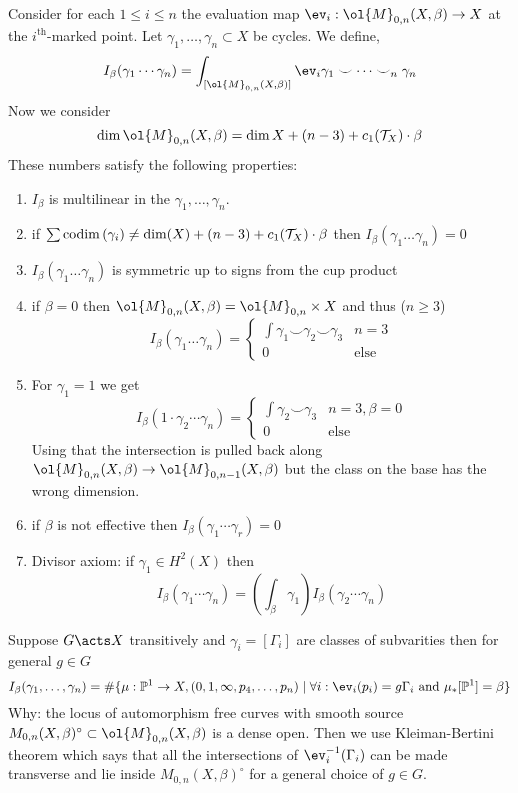 \documentclass[12pt]{article}
\begin{document}
{Consider for each $1 \le i \le n$ the evaluation map $\ev_i : \ol{M}_{0,n}(X, \beta) \to X$ at the $i^{\text{th}}$-marked point. Let $\gamma_1, \dots, \gamma_n \subset X$ be cycles. We define,
\[ I_\beta(\gamma_1 \cdots \gamma_n) = \int_{[ \ol{M}_{0,n}(X, \beta) ]} \ev_i \gamma_1 \smile \cdots \smile_n \gamma_n \]
Now we consider
\[ \dim{\ol{M}_{0,n}(X, \beta)} = \dim{X} + (n-3) + c_1(\T_X) \cdot \beta \]
These numbers satisfy the following properties:
\begin{enumerate}
\item $I_\beta$ is multilinear in the $\gamma_1, \dots, \gamma_n$.
\item if $\sum \mathrm{codim}\left( \gamma_i \right) \neq \dim(X) + (n-3) + c_1(\mathcal{T}_X) \cdot \beta$ then $I_\beta(\gamma_1 \dots \gamma_n) = 0$
\item $I_\beta(\gamma_1 \dots \gamma_n)$ is symmetric up to signs from the cup product
\item if $\beta = 0$ then $\ol{M}_{0,n}(X, \beta) = \ol{M}_{0,n} \times X$ and thus ($n \ge 3$)
\[ I_\beta(\gamma_1 \dots \gamma_n) = 
\begin{cases}
\int \gamma_1 \smile  \gamma_2 \smile \gamma_3 & n = 3
\\
0 & \text{else}
\end{cases} \] 
\item For $\gamma_1 = 1$ we get
\[ I_\beta(1 \cdot \gamma_2 \cdots \gamma_n) = 
\begin{cases}
\int \gamma_2 \smile \gamma_3 & n = 3, \beta = 0
\\
0 & \text{else}
\end{cases} \]
Using that the intersection is pulled back along $\ol{M}_{0, n}(X, \beta) \to \ol{M}_{0,n-1}(X, \beta)$ but the class on the base has the wrong dimension. 
\item if $\beta$ is not effective then $I_\beta(\gamma_1 \cdots \gamma_r) = 0$
\item Divisor axiom: if $\gamma_1 \in H^2(X)$ then
\[ I_\beta(\gamma_1 \cdots \gamma_n) = \left( \int_\beta \gamma_1 \right) I_\beta(\gamma_2 \cdots \gamma_n) \] 
\end{enumerate}

\begin{example}
Suppose $G \acts X$ transitively and $\gamma_i = [\Gamma_i]$ are classes of subvarities then for general $g \in G$
\[ I_\beta(\gamma_1, \dots, \gamma_n) = \# \{ \mu : \P^1 \to X, (0,1, \infty, p_4, \dots, p_n) \mid \forall i : \ev_i(p_i) = g \Gamma_i \text{ and } \mu_* [\P^1] = \beta \} \]
Why: the locus of automorphism free curves with smooth source $M_{0,n}(X, \beta)^\circ \subset \ol{M}_{0,n}(X, \beta)$ is a dense open. Then we use Kleiman-Bertini theorem which says that all the intersections of $\ev_i^{-1}(\Gamma_i)$ can be made transverse and lie inside $M_{0,n}(X, \beta)^\circ$ for a general choice of $g \in G$. 
\end{example}

}
\end{document}
